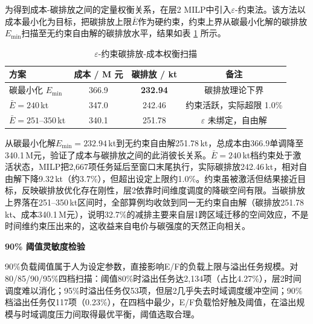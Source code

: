 为得到成本-碳排放之间的定量权衡关系，在层2 MILP中引入$\varepsilon$-约束法。该方法以成本最小化为目标，把碳排放上限$\bar{E}$作为硬约束，约束上界从碳最小化解的碳排放$E_{\text{min}}$扫描至无约束自由解的碳排放水平，结果如表 \ref{tab:epsilon} 所示。

\begin{table}[ht]
\centering
\caption{$\varepsilon$-约束碳排放-成本权衡扫描}
\label{tab:epsilon}
\begin{tabular}{lccc}
\toprule
方案 & 成本 / M 元 & 碳排放 / kt & 备注 \\
\midrule
碳最小化 $E_{\text{min}}$ & 366.9 & \textbf{232.94} & 碳排放理论下界 \\
$\bar{E}=240$\,kt      & 347.0 & 242.46      & 约束活跃，实际超限 1.0\%  \\
$\bar{E}=251$--$350$\,kt & 340.1 & 251.78      & $\varepsilon$ 未绑定，自由解 \\
\bottomrule
\end{tabular}
\end{table}

从碳最小化解$E_{\text{min}}=232.94$\,kt到无约束自由解251.78\,kt，总成本由366.9单调降至340.1\,M元，验证了成本与碳排放之间的此消彼长关系。$\bar{E}=240$\,kt档约束处于激活状态，MILP把2{,}667项任务延后至窗口末尾执行，实际碳排放242.46\,kt，相对自由解下降9.32\,kt（约3.7\%），但超出设定上限约1.0\%。约束虽被激活但结果接近目标，反映碳排放优化存在刚性，层2依靠时间维度调度的降碳空间有限。当碳排放上界落在251--350\,kt区间时，全部算例均收敛到同一无约束自由解（碳排放251.78\,kt、成本340.1\,M元），说明32.7\%的减排主要来自层1跨区域迁移的空间效应，不是时间维约束压出来的，这收益来自电价与碳强度的天然正向相关。

\medskip\noindent\textbf{90\% 阈值灵敏度检验}\medskip

90\%负载阈值属于人为设定参数，直接影响E/F的负载上限与溢出任务规模。对80/85/90/95\%四档扫描：阈值80\%时溢出任务达2{,}134项（占比4.27\%），层2时间调度难以消化；95\%时溢出任务仅53项，但层2几乎失去时域调度缓冲空间；90\%档溢出任务仅117项（0.23\%），在四档中最少，E/F负载恰好触及阈值，在溢出规模与时域调度压力间取得最优平衡，阈值选取合理。
